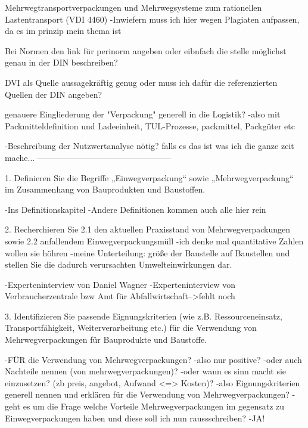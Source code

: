 

Mehrwegtransportverpackungen und Mehrwegsysteme zum rationellen Lastentransport (VDI 4460)
    -Inwiefern muss ich hier wegen Plagiaten aufpassen, da es im prinzip mein thema ist
    
Bei Normen den link für perinorm angeben oder eibnfach die stelle möglichst genau in der DIN beschreiben?

DVI als Quelle aussagekräftig genug oder muss ich dafür die referenzierten Quellen der DIN angeben?

genauere Eingliederung der "Verpackung" generell in die Logistik?
    -also mit Packmitteldefinition und Ladeeinheit, TUL-Prozesse, packmittel, Packgüter etc
    
-Beschreibung der Nutzwertanalyse nötig? falls es das ist was ich die ganze zeit mache... 
------------------------------------------------

1. Definieren Sie die Begriffe „Einwegverpackung“ sowie „Mehrwegverpackung“ im Zusammenhang von
Bauprodukten und Baustoffen.

    -Ins Definitionskapitel
    -Andere Definitionen kommen auch alle hier rein


2. Recherchieren Sie 
    2.1 den aktuellen Praxisstand von Mehrwegverpackungen sowie
    2.2 anfallendem Einwegverpackungsmüll 
            -ich denke mal quantitative Zahlen wollen sie höhren
                -meine Unterteilung: größe der Baustelle
    auf Baustellen und stellen Sie die dadurch verursachten Umwelteinwirkungen dar.

    -Experteninterview von Daniel Wagner
    -Experteninterview von Verbraucherzentrale bzw Amt für Abfallwirtschaft-->fehlt noch

3. Identifizieren Sie passende Eignungskriterien (wie z.B. Ressourceneinsatz, Transportfähigkeit,
Weiterverarbeitung etc.) für die Verwendung von Mehrwegverpackungen für Bauprodukte und Baustoffe.

        -FÜR die Verwendung von Mehrwegverpackungen?
            -also nur positive? 
                -oder auch Nachteile nennen (von mehrwegverpackungen)?
            -oder wann es sinn macht sie einzusetzen? (zb preis, angebot, Aufwand <=> Kosten)?
                -also Eignungskriterien generell nennen und erklären für die Verwendung von Mehrwegverpackungen?
            -geht es um die Frage welche Vorteile Mehrwegverpackungen im gegensatz zu Einwegverpackungen haben und diese soll ich nun raussschreiben?
                -JA!

